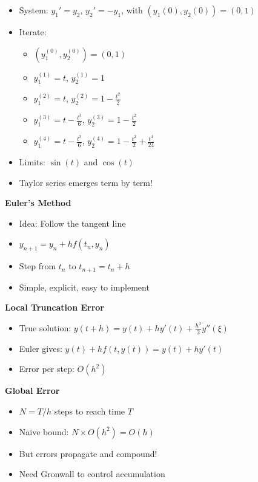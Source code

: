 \documentclass[
  10pt,
  letterpaper,
]{scrbook}
\providecommand{\tightlist}{%
  \setlength{\itemsep}{0pt}\setlength{\parskip}{0pt}}
\begin{document}
\begin{itemize}
\tightlist
\item
  System: \(y_1' = y_2\), \(y_2' = -y_1\), with
  \((y_1(0), y_2(0)) = (0, 1)\)
\item
  Iterate:

  \begin{itemize}
  \tightlist
  \item
    \((y_1^{(0)}, y_2^{(0)}) = (0, 1)\)
  \item
    \(y_1^{(1)} = t\), \(y_2^{(1)} = 1\)
  \item
    \(y_1^{(2)} = t\), \(y_2^{(2)} = 1 - \frac{t^2}{2}\)
  \item
    \(y_1^{(3)} = t - \frac{t^3}{6}\), \(y_2^{(3)} = 1 - \frac{t^2}{2}\)
  \item
    \(y_1^{(4)} = t - \frac{t^3}{6}\),
    \(y_2^{(4)} = 1 - \frac{t^2}{2} + \frac{t^4}{24}\)
  \end{itemize}
\item
  Limits: \(\sin(t)\) and \(\cos(t)\)
\item
  Taylor series emerges term by term!
\end{itemize}

\textbf{Euler's Method}

\begin{itemize}
\tightlist
\item
  Idea: Follow the tangent line
\item
  \(y_{n+1} = y_n + h f(t_n, y_n)\)
\item
  Step from \(t_n\) to \(t_{n+1} = t_n + h\)
\item
  Simple, explicit, easy to implement
\end{itemize}

\textbf{Local Truncation Error}

\begin{itemize}
\tightlist
\item
  True solution: \(y(t + h) = y(t) + hy'(t) + \frac{h^2}{2}y''(\xi)\)
\item
  Euler gives: \(y(t) + hf(t, y(t)) = y(t) + hy'(t)\)
\item
  Error per step: \(O(h^2)\)
\end{itemize}

\textbf{Global Error}

\begin{itemize}
\tightlist
\item
  \(N = T/h\) steps to reach time \(T\)
\item
  Naive bound: \(N \times O(h^2) = O(h)\)
\item
  But errors propagate and compound!
\item
  Need Gronwall to control accumulation
\end{itemize}
\end{document}
